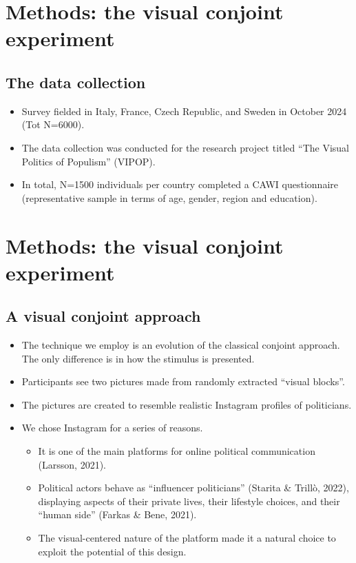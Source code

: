 \documentclass[
]{article}
\providecommand{\tightlist}{%
  \setlength{\itemsep}{0pt}\setlength{\parskip}{0pt}}
\begin{document}
\section{Methods: the visual conjoint
experiment}\label{methods-the-visual-conjoint-experiment}

\subsection{The data collection}\label{the-data-collection}

\begin{itemize}
\tightlist
\item
  Survey fielded in Italy, France, Czech Republic, and Sweden in October
  2024 (Tot N=6000).
\item
  The data collection was conducted for the research project titled
  ``The Visual Politics of Populism'' (VIPOP).
\item
  In total, N=1500 individuals per country completed a CAWI
  questionnaire (representative sample in terms of age, gender, region
  and education).
\end{itemize}

\section{Methods: the visual conjoint
experiment}\label{methods-the-visual-conjoint-experiment-1}

\subsection{A visual conjoint
approach}\label{a-visual-conjoint-approach}

\begin{itemize}
\tightlist
\item
  The technique we employ is an evolution of the classical conjoint
  approach. The only difference is in how the stimulus is presented.
\item
  Participants see two pictures made from randomly extracted ``visual
  blocks''.
\item
  The pictures are created to resemble realistic Instagram profiles of
  politicians.
\item
  We chose Instagram for a series of reasons.

  \begin{itemize}
  \item
    It is one of the main platforms for online political communication
    (Larsson, 2021).
  \item
    Political actors behave as ``influencer politicians'' (Starita \&
    Trillò, 2022), displaying aspects of their private lives, their
    lifestyle choices, and their ``human side'' (Farkas \& Bene, 2021).
  \item
    The visual-centered nature of the platform made it a natural choice
    to exploit the potential of this design.
  \end{itemize}
\end{itemize}
\end{document}
